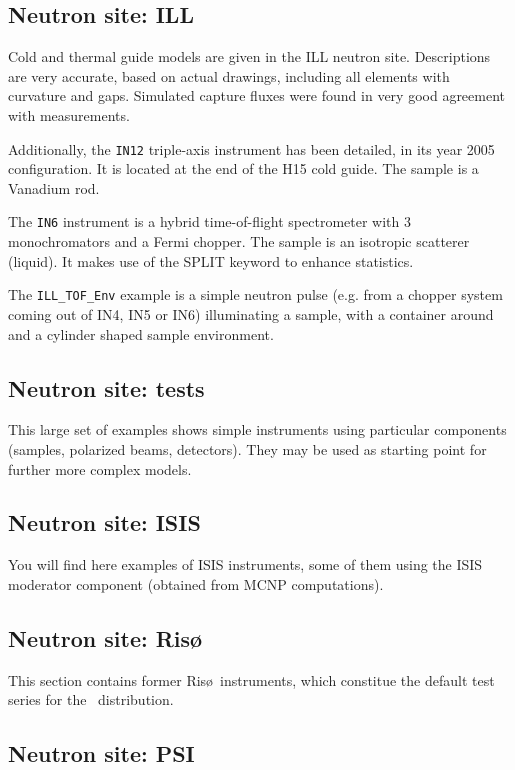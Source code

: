 \subsection{Neutron site: ILL}

Cold and thermal guide models are given in the ILL neutron site. Descriptions are very accurate, based on actual drawings, including all elements with curvature and gaps. Simulated capture fluxes were found in very good agreement with measurements.

Additionally, the \verb+IN12+ triple-axis instrument has been detailed, in its
year 2005 configuration. It is located at the end of the H15 cold guide. The
sample is a Vanadium rod.

The \verb+IN6+ instrument is a hybrid time-of-flight spectrometer with 3
monochromators and a Fermi chopper. The sample is an isotropic scatterer
(liquid). It makes use of the SPLIT keyword to enhance statistics.

The \verb+ILL_TOF_Env+ example is a simple neutron pulse (e.g. from a chopper system coming out of IN4, IN5 or IN6) illuminating a sample, with a container around and a cylinder shaped sample environment.

\subsection{Neutron site: tests}

This large set of examples shows simple instruments using particular components (samples, polarized beams, detectors). They may be used as starting point for further more complex models.

\subsection{Neutron site: ISIS}

You will find here examples of ISIS instruments, some of them using the ISIS moderator component (obtained from MCNP computations).

\subsection{Neutron site: Ris\o\ }

This section contains former Ris\o\  instruments, which constitue the default test series for the \MCS\ distribution.

\subsection{Neutron site: PSI}

